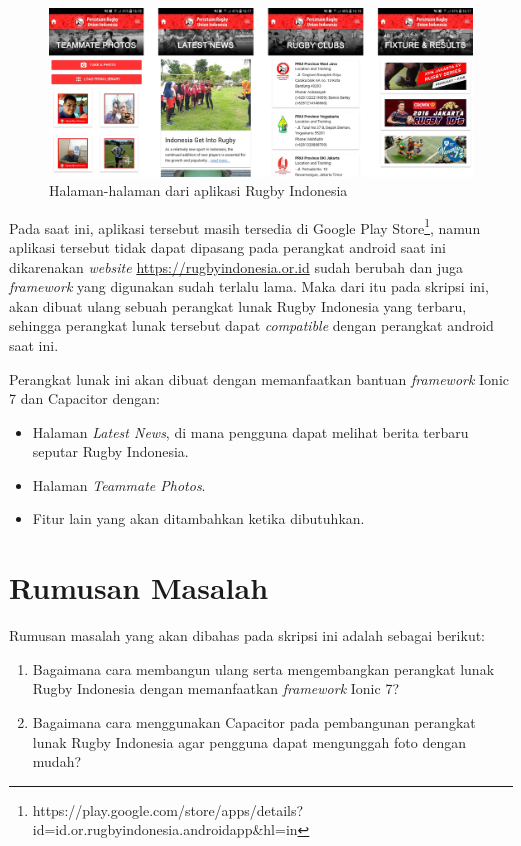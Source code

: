 \documentclass[a4paper,twoside]{article}
\begin{document}
\begin{figure} [!h]
    \centering
    \includegraphics[scale=0.725]{Images/Rugby-Indonesia-App-UI.png}
    \caption[Halaman aplikasi Rugby Indonesia]{Halaman-halaman dari aplikasi Rugby Indonesia}
    \label{fig:rugby-halaman-label}
\end{figure}

Pada saat ini, aplikasi tersebut masih tersedia di Google Play Store\footnote{https://play.google.com/store/apps/details?id=id.or.rugbyindonesia.androidapp\&hl=in}, namun aplikasi tersebut tidak dapat dipasang pada perangkat android saat ini dikarenakan \textit{website} \url{https://rugbyindonesia.or.id} sudah berubah dan juga \textit{framework} yang digunakan sudah terlalu lama. Maka dari itu pada skripsi ini, akan dibuat ulang sebuah perangkat lunak Rugby Indonesia yang terbaru, sehingga perangkat lunak tersebut dapat \textit{compatible} dengan perangkat android saat ini.

Perangkat lunak ini akan dibuat dengan memanfaatkan bantuan {\it framework} Ionic 7 dan Capacitor dengan:

\begin{itemize}
    \item Halaman \textit{Latest News}, di mana pengguna dapat melihat berita terbaru seputar Rugby Indonesia.
    \item Halaman \textit{Teammate Photos}.
    \item Fitur lain yang akan ditambahkan ketika dibutuhkan.
\end{itemize}


\section{Rumusan Masalah}
Rumusan masalah yang akan dibahas pada skripsi ini adalah sebagai berikut:
\begin{enumerate}
    \item Bagaimana cara membangun ulang serta mengembangkan perangkat lunak Rugby Indonesia dengan memanfaatkan \textit{framework} Ionic 7?
    \item Bagaimana cara menggunakan Capacitor pada pembangunan perangkat lunak Rugby Indonesia agar pengguna dapat mengunggah foto dengan mudah?
\end{enumerate}
\end{document}
